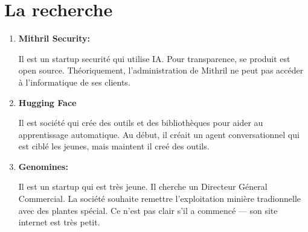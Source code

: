 \documentclass{article}
\begin{document}
\section{La recherche}

\begin{enumerate}
	\item \textbf{Mithril Security:}

	      Il est un startup securité qui utilise IA. Pour transparence, se
	      produit est open source. Théoriquement, l'administration de Mithril
	      ne peut pas accéder à l'informatique de ses clients.

	\item \textbf{Hugging Face}

	      Il est société qui crée des outils et des bibliothèques pour aider au
	      apprentissage automatique. Au début, il créait un agent
	      conversationnel qui est ciblé les jeunes, mais maintent il creé des
	      outils.

	\item \textbf{Genomines:}

	      Il est un startup qui est très jeune. Il cherche un Directeur Géneral
	      Commercial. La société souhaite remettre l'exploitation minière
	      tradionnelle avec des plantes spécial. Ce n'est pas clair s'il a
          commencé — son site internet est très petit.

\end{enumerate}
\end{document}
